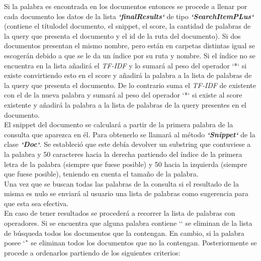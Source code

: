 \documentclass{article}
\begin{document}
\begin{flushleft}
{Si la palabra es encontrada en los documentos entonces se procede a llenar por cada 
documento los datos de la lista \textbf{\textit{`finalResults`}} de tipo \textbf{\textit{`SearchItemPLus`}} (contiene el títulodel documento, el snippet, el score, la cantidad de palabras de la query que presenta el documento y el id de la ruta del documento). Si dos documentos presentan el mismo nombre, pero están en carpetas distintas igual se escogerán debido a que se le da un 
índice por su ruta y nombre. Si el índice no se encuentra en la lista añadirá el \textit{TF-IDF} y 
lo sumará al peso del operador `*` si existe convirtiendo esto en el score y añadirá la 
palabra a la lista de palabras de la query que presenta el documento. De lo contrario 
suma el \textit{TF-IDF} de existente con el de la nueva palabra y sumará al peso del operador 
`*` si existe al score existente y añadirá la palabra a la lista de palabras de la query 
presentes en el documento.\linebreak \\

El snippet del documento se calculará a partir de la primera palabra de la consulta que
aparezca en él. Para obtenerlo se llamará al método \textbf{\textit{`Snippet`}} de la clase \textbf{\textit{`Doc`}}. Se estableció que este debía devolver un substring que contuviese a la palabra y 50 caracteres hacia la derecha partiendo del índice de la primera letra de la palabra (siempre 
que fuese posible) y 50 hacia la izquierda (siempre que fuese posible), teniendo en 
cuenta el tamaño de la palabra.\linebreak \\

Una vez que se buscan todas las palabras de la consulta si el resultado de la misma es 
nulo se enviará al usuario una lista de palabras como sugerencia para que esta sea 
efectiva.\linebreak \\

En caso de tener resultados se procederá a recorrer la lista de palabras con operadores. 
Si se encuentra que alguna palabra contiene `\textexclamdown` se eliminan de la lista de búsqueda todos los documentos que la contengan. En cambio, si la palabra posee `\^` se eliminan todos 
los documentos que no la contengan. Posteriormente se procede a ordenarlos partiendo 
de los siguientes criterios:}


\end{flushleft}
\end{document}
